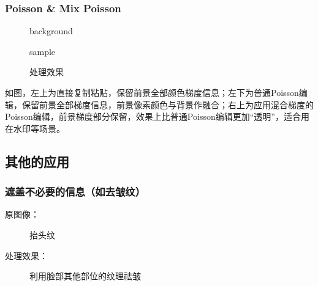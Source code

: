 \documentclass[14pt]{scrartcl} %
\begin{document}
	\pagebreak
	\subsubsection{Poisson \& Mix Poisson}
	
	\begin{figure}[h] %
		\begin{minipage}[t]{0.5\linewidth}
			\centering
			\caption{background}
		\end{minipage}%
		\begin{minipage}[t]{0.5\linewidth}
			\centering
			\caption{sample}
		\end{minipage}
	\end{figure}
	
	\begin{figure}[h] %
		\centering
		\caption{处理效果}
	\end{figure}
	如图，左上为直接复制粘贴，保留前景全部颜色梯度信息；左下为普通Poisson编辑，保留前景全部梯度信息，前景像素颜色与背景作融合；右上为应用混合梯度的Poisson编辑，前景梯度部分保留，效果上比普通Poisson编辑更加“透明”，适合用在水印等场景。
	
	\pagebreak
	\subsection{其他的应用}
	
	\subsubsection{遮盖不必要的信息（如去皱纹）}
	
	原图像：
	
	\begin{figure}[h] %
		\centering
		\caption{抬头纹}
	\end{figure}
	
	处理效果：
	
	\begin{figure}[h] %
		\centering
		\caption{利用脸部其他部位的纹理祛皱}
	\end{figure}
	
\end{document}
